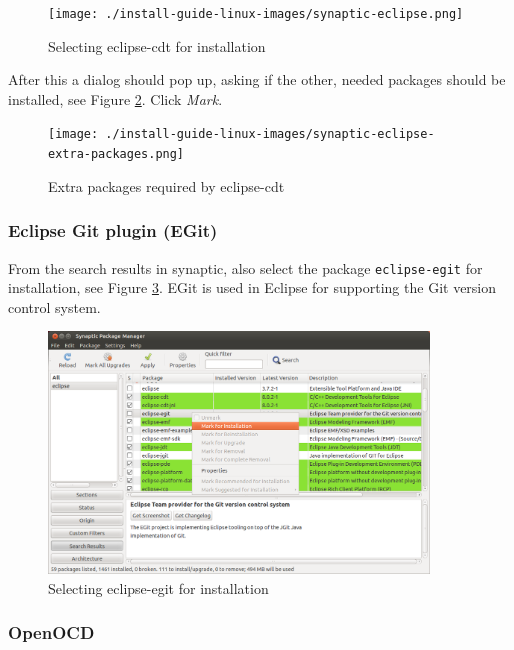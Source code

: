 \documentclass[a4paper, 10pt]{article}
\begin{document}
    \begin{figure}[H]
    \centering
        \texttt{[image: ./install-guide-linux-images/synaptic-eclipse.png]}
        \caption{Selecting eclipse-cdt for installation}
        \label{fig:synaptic-eclipse}
    \end{figure}

After this a dialog should pop up, asking if the other, needed packages should be installed,
see Figure \ref{fig:synaptic-eclipse-extra-packages.png}. Click \emph{Mark}.

    \begin{figure}[H]
    \centering
        \texttt{[image: ./install-guide-linux-images/synaptic-eclipse-extra-packages.png]}
        \caption{Extra packages required by eclipse-cdt}
        \label{fig:synaptic-eclipse-extra-packages.png}
    \end{figure}

\subsubsection{Eclipse Git plugin (EGit)}

From the search results in synaptic, also select the package
\verb+eclipse-egit+ for installation, see
Figure \ref{fig:synapic-eclipse-egit.png}.
EGit is used in Eclipse for supporting the Git version control system.

    \begin{figure}[H]
    \centering
        \includegraphics[width=0.9\textwidth]{./install-guide-linux-images/synaptic-eclipse-egit.png}
        \caption{Selecting eclipse-egit for installation}
        \label{fig:synapic-eclipse-egit.png}
    \end{figure}

\subsubsection{OpenOCD}
\end{document}
